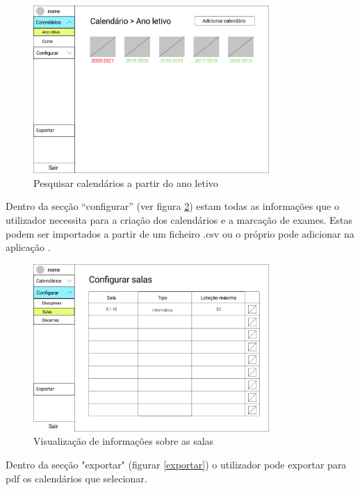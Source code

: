 \documentclass[11pt, twoside]{report}
\begin{document}
	\begin{figure}[H] 
		\centering 
		\includegraphics[width=0.8\textwidth,height=0.8\textheight,keepaspectratio]{image/prototipowireframes/pesquisacalendarioanoletivo}
		\caption{Pesquisar calendários a partir do ano letivo}
		\label{menucalendario}
	\end{figure}
	
	Dentro da secção ``configurar'' (ver figura \ref{configurarsalas}) estam todas as informações que o utilizador necessita para a criação dos calendários e a marcação de exames. Estas podem ser importados a partir de um ficheiro .csv ou o próprio pode adicionar na aplicação . 
	
	
	\begin{figure}[H] 
		\centering 
		\includegraphics[width=0.8\textwidth,height=0.8\textheight,keepaspectratio]{image/prototipowireframes/configurarsalas}
		\caption{Visualização de informações sobre as salas}
		\label{configurarsalas}
	\end{figure}
	
	Dentro da secção "exportar"  (figurar \ref{exportar}) o utilizador pode exportar para pdf os calendários que selecionar.
	
\end{document}
